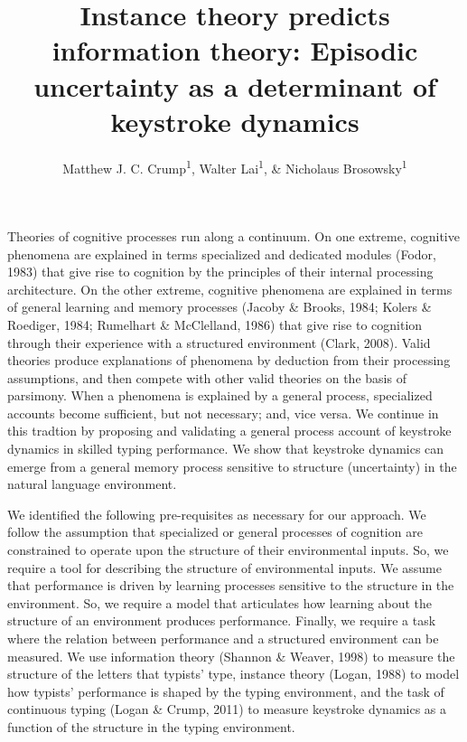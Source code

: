 \documentclass[floatsintext,man]{apa6}
\title{Instance theory predicts information theory: Episodic uncertainty as a
determinant of keystroke dynamics}
\author{Matthew J. C. Crump\textsuperscript{1}, Walter Lai\textsuperscript{1}, \& Nicholaus Brosowsky\textsuperscript{1}}
\affiliation{
    \vspace{0.5cm}
          \textsuperscript{1} Brooklyn College of the City University of New York  }
\theoremstyle{definition}
\theoremstyle{definition}
\theoremstyle{definition}
\theoremstyle{remark}
\begin{document}
\maketitle

\setcounter{secnumdepth}{0}



Theories of cognitive processes run along a continuum. On one extreme,
cognitive phenomena are explained in terms specialized and dedicated
modules (Fodor, 1983) that give rise to cognition by the principles of
their internal processing architecture. On the other extreme, cognitive
phenomena are explained in terms of general learning and memory
processes (Jacoby \& Brooks, 1984; Kolers \& Roediger, 1984; Rumelhart
\& McClelland, 1986) that give rise to cognition through their
experience with a structured environment (Clark, 2008). Valid theories
produce explanations of phenomena by deduction from their processing
assumptions, and then compete with other valid theories on the basis of
parsimony. When a phenomena is explained by a general process,
specialized accounts become sufficient, but not necessary; and, vice
versa. We continue in this tradtion by proposing and validating a
general process account of keystroke dynamics in skilled typing
performance. We show that keystroke dynamics can emerge from a general
memory process sensitive to structure (uncertainty) in the natural
language environment.

We identified the following pre-requisites as necessary for our
approach. We follow the assumption that specialized or general processes
of cognition are constrained to operate upon the structure of their
environmental inputs. So, we require a tool for describing the structure
of environmental inputs. We assume that performance is driven by
learning processes sensitive to the structure in the environment. So, we
require a model that articulates how learning about the structure of an
environment produces performance. Finally, we require a task where the
relation between performance and a structured environment can be
measured. We use information theory (Shannon \& Weaver, 1998) to measure
the structure of the letters that typists' type, instance theory (Logan,
1988) to model how typists' performance is shaped by the typing
environment, and the task of continuous typing (Logan \& Crump, 2011) to
measure keystroke dynamics as a function of the structure in the typing
environment.
\end{document}
